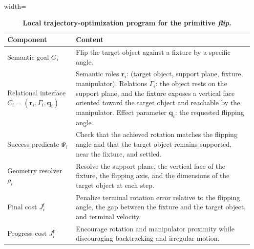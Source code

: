 \begin{table}[t]
    \caption{\textbf{Local trajectory-optimization program for the primitive \textit{flip}.}}
    \label{tab:flip_primitive}
    \centering
    \begin{adjustbox}{width=\columnwidth}
    \setlength{\tabcolsep}{3pt}
    \begin{tabular}{>{\raggedright\arraybackslash}m{}
                        >{\raggedright\arraybackslash}m{}}
        \toprule
        \textbf{Component} & \textbf{Content} \\
        \midrule
        Semantic goal $G_i$
            & Flip the target object against a fixture by a specific angle. \\
        \addlinespace[2pt]
        \rowcolor{black!5}
        Relational interface \newline $C_i=(\mathbf{r}_i,\Gamma_i,\mathbf{q}_i)$
            & Semantic roles $\mathbf{r}_i$: (target object, support plane, fixture, manipulator). \newline
            Relations $\Gamma_i$: the object rests on the support plane, and the fixture exposes a vertical face oriented toward the target object and reachable by the manipulator. \newline 
            Effect parameter $\mathbf{q}_i$: the requested flipping angle.\\
        \addlinespace[2pt]
        Success predicate $\Psi_i$
            & Check that the achieved rotation matches the flipping angle and that the
              target object remains supported, near the fixture, and settled. \\
        \addlinespace[2pt]
        \rowcolor{black!5}
        Geometry resolver $\rho_i$
            & Resolve the support plane, the vertical face of the fixture, the flipping axis, and the dimensions of the target object at each step. \\
        \addlinespace[2pt]
        Final cost $J_i^{\mathrm{f}}$
            & Penalize terminal rotation error relative to the flipping angle, the gap between the fixture and the target object, and terminal velocity. \\
        \addlinespace[2pt]
        \rowcolor{black!5}
        Progress cost $J_i^{\mathrm{p}}$
            & Encourage rotation and manipulator proximity while discouraging
              backtracking and irregular motion. \\
        \bottomrule
    \end{tabular}
    \end{adjustbox}
    \vspace{-0.2in}
\end{table}

